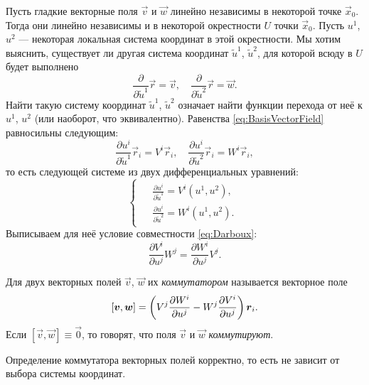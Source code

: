 Пусть гладкие векторные поля $\vec{v}$ и $\vec{w}$ линейно независимы в некоторой точке $\vec{x}_0$. Тогда они линейно независимы и в некоторой окрестности $U$ точки $\vec{x}_0$. Пусть $u^1$, $u^2$ --- некоторая локальная система координат в этой окрестности. Мы хотим выяснить, существует ли другая система координат $\widetilde{u}^1$, $\widetilde{u}^2$, для которой всюду в $U$ будет выполнено
\begin{equation} \label{eq:BasisVectorField}
	\frac{\partial}{\partial\widetilde{u}^1}\vec{r} = \vec{v},\quad \frac{\partial}{\partial\widetilde{u}^2}\vec{r} = \vec{w}.
\end{equation}
Найти такую систему координат $\widetilde{u}^1$, $\widetilde{u}^2$ означает найти функции перехода от неё к $u^1$, $u^2$ (или наоборот, что эквивалентно). Равенства \eqref{eq:BasisVectorField} равносильны следующим:
\[
	\frac{\partial u^i}{\partial \widetilde{u}^1}\vec{r}_i = V^i\vec{r}_i,\quad
	\frac{\partial u^i}{\partial \widetilde{u}^2}\vec{r}_i = W^i\vec{r}_i,
\]
то есть следующей системе из двух дифференциальных уравнений:
\[
	\begin{cases}
		\begin{aligned}
			& \frac{\partial u^i}{\partial\widetilde{u}^1} = V^i(u^1, u^2),\\
			& \frac{\partial u^i}{\partial\widetilde{u}^2} = W^i(u^1, u^2).
		\end{aligned}
	\end{cases}
\]
Выписываем для неё условие совместности \eqref{eq:Darboux}:
\[
	\frac{\partial V^i}{\partial u^j}W^j = \frac{\partial W^i}{\partial u^j}V^j.
\]

\begin{definition}
	Для двух векторных полей $\vec{v}$, $\vec{w}$ их \textit{коммутатором} называется векторное поле
	\[
		[\boldsymbol{v}, \boldsymbol{w}] = \left(V^j\frac{\partial W^i}{\partial u^j} - W^j\frac{\partial V^i}{\partial u^j}\right)\boldsymbol{r}_i.
	\]
	Если $[\vec{v}, \vec{w}] \equiv \vec{0}$, то говорят, что поля $\vec{v}$ и $\vec{w}$ \textit{коммутируют}.
\end{definition}

\begin{proposition}
	Определение коммутатора векторных полей корректно, то есть не зависит от выбора системы координат.
\end{proposition}

